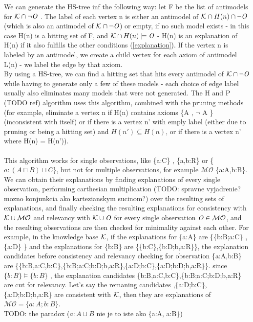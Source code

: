 We can generate the HS-tree inf the following way: let F be the list of antimodels for $\mathcal{K} \cap \neg \mathit{O}$ . The label of each vertex n is either an antimodel of $\mathcal{K} \cap H(n) \cap \neg \mathit{O}$ (which is also an antimodel of $\mathcal{K} \cap \neg \mathit{O}$) or empty, if no such model exists - in this case H(n) is a hitting set of F, and $\mathcal{K} \cap H(n) \models \mathit{O}$ - H(n) is an explanation of H(n) if it also fulfills the other conditions (\ref{explanation}). If the vertex n is labeled by an antimodel, we create a child vertex for each axiom of antimodel L(n) - we label the edge by that axiom. \\
By using a HS-tree, we can find a hitting set that hits every antimodel of $\mathcal{K} \cap \neg \mathit{O}$ while having to generate only a few of these models - each choice of edge label usually also eliminates many models that were not generated. 
The H and P (TODO ref) algorithm uses this algorithm, combined with the pruning methods (for example, eliminate a vertex n if H(n) contains axioms \{A , $\neg$ A \} (inconsistent with itself) or if there is a vertex n' with emply label (either due to pruning or being a hitting set) and $H(n') \subseteq H(n)$, or if there is a vertex n' where H(n) = H(n')).    \\
\\
This algorithm works for single observations, like \{a:C\} , \{a,b:R\} or \{ $a:(A \sqcap B) \sqcup C $\}, but not for multiple observations, for example $\mathcal{MO}$ \{a:A,b:B\}. We can obtain their explanations by finding explanations of every single observation, performing carthesian multiplication (TODO: spravne vyjadrenie? mozno konjunkcia ako kartezianskym sucinom?) over the resulting sets of explanations, and finally checking the resulting explanations for consistency with $\mathcal{K} \cup \mathcal{MO}$ and relevancy with $\mathcal{K} \cup \mathit{O}$ for every single observation $\mathit{O} \in \mathcal{MO} $, and the resulting observations are then checked for minimality against each other. For example, in the knowledge base $\mathcal{K}$, if the explanations for \{a:A\} are \{\{b:B;a:C\} , \{a:D\} \} and the explanations for \{b:B\} are \{\{b:C\},\{b:D;b,a:R\}\}, the explanation candidates before consistency and relevancy checking for observation \{a:A,b:B\} are \{\{b:B,a:C,b:C\},\{b:B;a:C;b:D;b,a:R\},\{a:D;b:C\},\{a:D;b:D;b,a:R\}\}. since  $ \{b:B\} \models \{b:B\}$ , the explanation candidates  \{b:B,a:C,b:C\},\{b:B;a:C;b:D;b,a:R\} are cut for relevancy. Let's say the remaning candidates ,\{a:D;b:C\},\{a:D;b:D;b,a:R\} are consistent with $\mathcal{K}$, then they are explanations of $\mathcal{MO} = \{a:A ; b:B\}$. \\
TODO: the paradox ($a:A \sqcup B$ nie je to iste ako \{a:A, a:B\})


